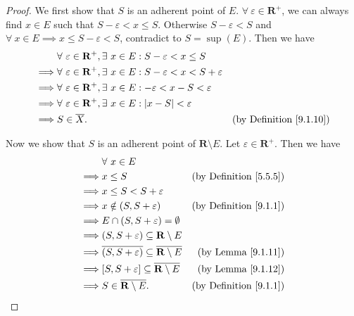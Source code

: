 \begin{proof}
    We first show that \(S\) is an adherent point of \(E\).
    \(\forall\ \varepsilon \in \mathbf{R}^+\), we can always find \(x \in E\) such that \(S - \varepsilon < x \leq S\).
    Otherwise \(S - \varepsilon < S\) and \(\forall\ x \in E \implies x \leq S - \varepsilon < S\), contradict to \(S = \sup(E)\).
    Then we have
    \begin{align*}
                 & \forall\ \varepsilon \in \mathbf{R}^+, \exists\ x \in E : S - \varepsilon < x \leq S                                                  \\
        \implies & \forall\ \varepsilon \in \mathbf{R}^+, \exists\ x \in E : S - \varepsilon < x < S + \varepsilon                                       \\
        \implies & \forall\ \varepsilon \in \mathbf{R}^+, \exists\ x \in E : -\varepsilon < x - S < \varepsilon                                          \\
        \implies & \forall\ \varepsilon \in \mathbf{R}^+, \exists\ x \in E : \abs*{x - S} < \varepsilon                                                  \\
        \implies & S \in \overline{X}.                                                                             & \text{(by Definition \ref{9.1.10})}
    \end{align*}

    Now we show that \(S\) is an adherent point of \(\mathbf{R} \setminus E\).
    Let \(\varepsilon \in \mathbf{R}^+\).
    Then we have
    \begin{align*}
                 & \forall\ x \in E                                                                                                 \\
        \implies & x \leq S                                                                    & \text{(by Definition \ref{5.5.5})} \\
        \implies & x \leq S < S + \varepsilon                                                                                       \\
        \implies & x \notin (S, S + \varepsilon)                                               & \text{(by Definition \ref{9.1.1})} \\
        \implies & E \cap (S, S + \varepsilon) = \emptyset                                                                          \\
        \implies & (S, S + \varepsilon) \subseteq \mathbf{R} \setminus E                                                            \\
        \implies & \overline{(S, S + \varepsilon)} \subseteq \overline{\mathbf{R} \setminus E} & \text{(by Lemma \ref{9.1.11})}     \\
        \implies & [S, S + \varepsilon] \subseteq \overline{\mathbf{R} \setminus E}            & \text{(by Lemma \ref{9.1.12})}     \\
        \implies & S \in \overline{\mathbf{R} \setminus E}.                                    & \text{(by Definition \ref{9.1.1})}
    \end{align*}
\end{proof}